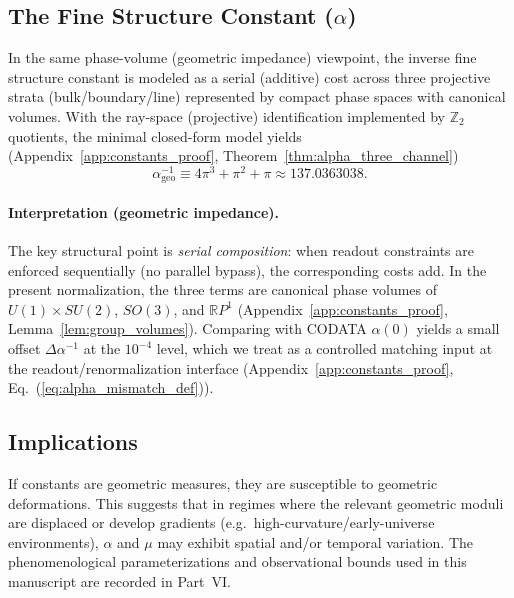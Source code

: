 \subsection{The Fine Structure Constant \texorpdfstring{($\alpha$)}{(alpha)}}
In the same phase-volume (geometric impedance) viewpoint, the inverse fine structure constant is modeled as a serial (additive) cost across three projective strata (bulk/boundary/line) represented by compact phase spaces with canonical volumes. With the ray-space (projective) identification implemented by $\mathbb{Z}_2$ quotients, the minimal closed-form model yields (Appendix~\ref{app:constants_proof}, Theorem~\ref{thm:alpha_three_channel})
\begin{equation}
\label{eq:alpha_geo}
    \alpha^{-1}_{\text{geo}} \equiv 4\pi^3 + \pi^2 + \pi \approx 137.0363038.
\end{equation}
\paragraph{Interpretation (geometric impedance).}
The key structural point is \emph{serial composition}: when readout constraints are enforced sequentially (no parallel bypass), the corresponding costs add. In the present normalization, the three terms are canonical phase volumes of $U(1)\times SU(2)$, $SO(3)$, and $\mathbb{R}P^1$ (Appendix~\ref{app:constants_proof}, Lemma~\ref{lem:group_volumes}). Comparing with CODATA $\alpha(0)$ \cite{CODATA2022RMP} yields a small offset $\Delta\alpha^{-1}$ at the $10^{-4}$ level, which we treat as a controlled matching input at the readout/renormalization interface (Appendix~\ref{app:constants_proof}, Eq.~(\ref{eq:alpha_mismatch_def})).

\subsection{Implications}
If constants are geometric measures, they are susceptible to geometric deformations. This suggests that in regimes where the relevant geometric moduli are displaced or develop gradients (e.g.\ high-curvature/early-universe environments), $\alpha$ and $\mu$ may exhibit spatial and/or temporal variation. The phenomenological parameterizations and observational bounds used in this manuscript are recorded in Part~VI.
